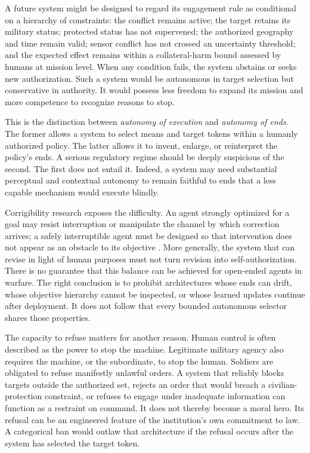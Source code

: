 \documentclass[11pt]{article}
\begin{document}
A future system might be designed to regard its engagement rule as conditional on a hierarchy of constraints: the conflict remains active; the target retains its military status; protected status has not supervened; the authorized geography and time remain valid; sensor conflict has not crossed an uncertainty threshold; and the expected effect remains within a collateral-harm bound assessed by humans at mission level. When any condition fails, the system abstains or seeks new authorization. Such a system would be autonomous in target selection but conservative in authority. It would possess less freedom to expand its mission and more competence to recognize reasons to stop.

This is the distinction between \emph{autonomy of execution} and \emph{autonomy of ends}. The former allows a system to select means and target tokens within a humanly authorized policy. The latter allows it to invent, enlarge, or reinterpret the policy's ends. A serious regulatory regime should be deeply suspicious of the second. The first does not entail it. Indeed, a system may need substantial perceptual and contextual autonomy to remain faithful to ends that a less capable mechanism would execute blindly.

Corrigibility research exposes the difficulty. An agent strongly optimized for a goal may resist interruption or manipulate the channel by which correction arrives; a safely interruptible agent must be designed so that intervention does not appear as an obstacle to its objective \citep{orseau2016, hadfieldmenell2017}. More generally, the system that can revise in light of human purposes must not turn revision into self-authorization. There is no guarantee that this balance can be achieved for open-ended agents in warfare. The right conclusion is to prohibit architectures whose ends can drift, whose objective hierarchy cannot be inspected, or whose learned updates continue after deployment. It does not follow that every bounded autonomous selector shares those properties.

The capacity to refuse matters for another reason. Human control is often described as the power to stop the machine. Legitimate military agency also requires the machine, or the subordinate, to stop the human. Soldiers are obligated to refuse manifestly unlawful orders. A system that reliably blocks targets outside the authorized set, rejects an order that would breach a civilian-protection constraint, or refuses to engage under inadequate information can function as a restraint on command. It does not thereby become a moral hero. Its refusal can be an engineered feature of the institution's own commitment to law. A categorical ban would outlaw that architecture if the refusal occurs after the system has selected the target token.
\end{document}
